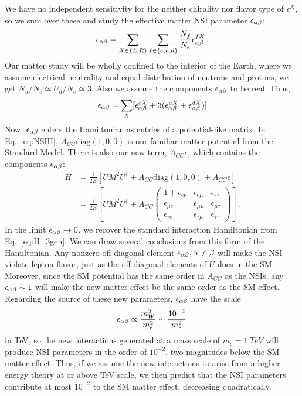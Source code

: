 \documentclass[draft=True]{thesis}
\begin{document}
We have no independent sensitivity for the neither chirality nor flavor type of $\epsilon^X$, so we sum over these and study the effective matter NSI parameter
 $\epsilon_{\alpha\beta}$:
\begin{align}
    \epsilon_{\alpha\beta} = \sum_{X \in \{L,R\}} \sum_{f \in \{e,u,d\}} \frac{N_f}{N_e} \epsilon^{fX}_{\alpha\beta}\,.
\end{align}
Our matter study will be wholly confined to the interior of the Earth, where we assume electrical neutrality and equal distribution of neutrons and protons, 
we get $N_u/N_e \simeq U_d/N_e \simeq 3$. Also we assume the components $\epsilon_{\alpha\beta}$ to be real. Thus,
\begin{align}
    \epsilon_{\alpha\beta} =  \sum_X [\epsilon_{\alpha\beta}^{eX} + 3(\epsilon_{\alpha\beta}^{uX} + \epsilon_{\alpha\beta}^{dX})]
\end{align}
Now, $\epsilon_{\alpha\beta}$ enters the Hamiltonian as entries of a potential-like matrix. In Eq.~\ref{eq:NSIH}, $A_{CC}\text{diag}(1,0,0)$ is our 
familiar matter potential from the Standard Model. There is also our new term, $A_{CC} \epsilon$, which contains the components $\epsilon_{\alpha\beta}$:
\begin{align}\label{eq:NSIH}
    H &= \frac{1}{2E} \left[UM^2U^\dagger + A_{CC}\text{diag}(1,0,0) + A_{CC} \epsilon \right] \nonumber \\
      &= \frac{1}{2E} \left[UM^2U^\dagger + A_{CC}
      \begin{pmatrix}
          1 + \epsilon_{ee} & \epsilon_{e\mu} & \epsilon_{e\tau}  \\
          \epsilon_{\mu e} & \epsilon_{\mu\mu} & \epsilon_{\mu\tau}  \\
          \epsilon_{\tau e} & \epsilon_{\tau\mu} & \epsilon_{\tau\tau}
      \end{pmatrix} \right]\,.
\end{align} 
In the limit $\epsilon_{\alpha\beta} \to 0$, we recover the standard interaction Hamiltonian from Eq.~\ref{eq:H_3gen}.
We can draw several conclusions from this form of the Hamiltonian. Any nonzero off-diagonal element $\epsilon_{\alpha\beta}, \alpha \neq \beta$ will make the NSI violate 
lepton flavor, just as the off-diagonal elements of $U$ does in the SM. Moreover, since the SM potential has the same order in $A_{CC}$ as the NSIs, 
any $\epsilon_{\alpha\beta} \sim 1$ will make the new matter effect be the same order as the SM effect.
Regarding the source of these new parameters, $\epsilon_{\alpha\beta}$ have the scale
\begin{align}
    \epsilon_{\alpha\beta} \propto \frac{m_W^2}{m_{\epsilon}^2} \sim \frac{10^{-2}}{m_\epsilon^2}\,
\end{align} 
in TeV, so the new interactions generated at a mass scale of $m_\epsilon = \SI{1}{TeV}$ will produce NSI parameters in the order of $10^{-2}$, 
two magnitudes below the SM matter effect. Thus, if we assume the new interactions to arise from a higher-energy theory at or above TeV scale, 
we then predict that the NSI parameters contribute at most $10^{-2}$ to the SM matter effect, decreasing quadratically.
\end{document}
